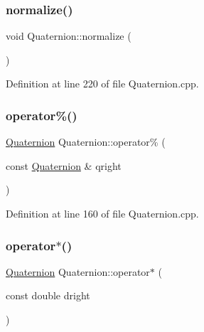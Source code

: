 \mbox{\label{class_quaternion_a48e6bafb249c895ed25f29dc9170e11e}} 
\subsubsection{\texorpdfstring{normalize()}{normalize()}}
{\footnotesize\ttfamily void Quaternion\+::normalize (\begin{DoxyParamCaption}{ }\end{DoxyParamCaption})}



Definition at line 220 of file Quaternion.\+cpp.

\mbox{\label{class_quaternion_a18d6d5dc6431906a5aa1e2bcfc4be310}} 
\subsubsection{\texorpdfstring{operator\%()}{operator\%()}}
{\footnotesize\ttfamily \mbox{\hyperlink{class_quaternion}{Quaternion}} Quaternion\+::operator\% (\begin{DoxyParamCaption}\item[{const \mbox{\hyperlink{class_quaternion}{Quaternion}} \&}]{qright }\end{DoxyParamCaption})}



Definition at line 160 of file Quaternion.\+cpp.

\mbox{\label{class_quaternion_a4b73b74aac843b8163e04c24b1c9bd69}} 
\subsubsection{\texorpdfstring{operator$\ast$()}{operator*()}\hspace{0.1cm}{\footnotesize\ttfamily [1/3]}}
{\footnotesize\ttfamily \mbox{\hyperlink{class_quaternion}{Quaternion}} Quaternion\+::operator$\ast$ (\begin{DoxyParamCaption}\item[{const double}]{dright }\end{DoxyParamCaption})}



